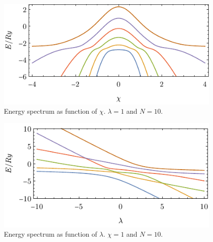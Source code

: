 \begin{figure}[H]
    \centering
    \includegraphics[scale=1.4]{../img/N=10_energiesl.pdf}
    \caption{Energy spectrum as function of $\chi$. $\lambda=1$ and $N=10$.}
    \label{fig:N=10_energiesl}    
\end{figure}
\begin{figure}[H]
    \centering
    \includegraphics[scale=1.4]{../img/N=10_energies2.pdf}
    \caption{Energy spectrum as function of $\lambda$. $\chi=1$ and $N=10$.}
    \label{fig:N=10_energies2}    
\end{figure}


